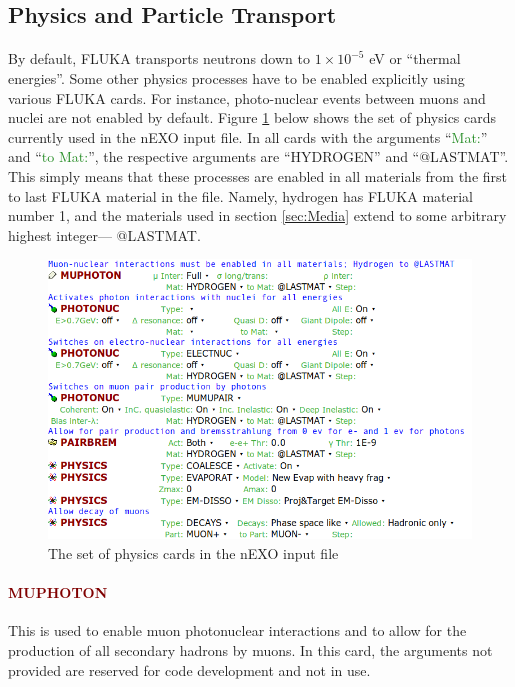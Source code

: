 \subsection{Physics and Particle Transport}

\paragraph{}
By default, FLUKA transports neutrons down to $1 \times 10^{-5}$ eV or ``thermal energies''. Some other physics processes have to be enabled explicitly using various FLUKA cards. For instance, photo-nuclear events between muons and nuclei are not enabled by default. Figure \ref{fig:physics1} below shows the set of physics cards currently used in the nEXO input file. In all cards with the arguments ``\textcolor{ForestGreen}{Mat:}'' and ``\textcolor{ForestGreen}{to Mat:}'', the respective arguments are ``HYDROGEN'' and ``@LASTMAT''. This simply means that these processes are enabled in all materials from the first to last FLUKA material in the file. Namely, hydrogen has FLUKA material number 1, and the materials used in section \ref{sec:Media} extend to some arbitrary highest integer— @LASTMAT.

\begin{figure}[h]
    \begin{center}
    \includegraphics[scale=0.5]{figures/physics.png}
    \caption{The set of physics cards in the nEXO input file}
    \label{fig:physics1}
    \end{center}
\end{figure}

\paragraph{\textcolor{Maroon}{MUPHOTON}}
This is used to enable muon photonuclear interactions and to allow for the production of all secondary hadrons by muons. In this card, the arguments not provided are reserved for code development and not in use.

